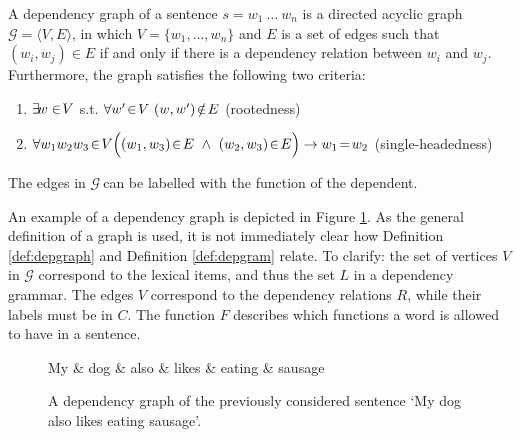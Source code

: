 \begin{definition}\label{def:depgraph}
A dependency graph of a sentence $s = w_1~\ldots~w_n$ is a directed acyclic graph $\mathcal{G} = \langle V, E\rangle$, in which $V = \{w_1, \ldots,w_n\}$ and $E$ is a set of edges such that $(w_i,w_j)\in E$ if and only if there is a dependency relation between $w_i$ and $w_j$. Furthermore, the graph satisfies the following two criteria:
\begin{enumerate}
\item $\exists\negthinspace w\in\negthinspace V$ s.t. $\forall w'\negthinspace\in\negthinspace V~(w,w')\negthinspace\notin\negthinspace E$ \hfill (rootedness)
\item $\forall w_1 w_2 w_3\negthinspace \in\negthinspace V\Big( (w_1,w_3)\negthinspace\in\negthinspace E~\land~(w_2,w_3)\negthinspace \in\negthinspace E\Big) \rightarrow w_1\negthinspace=\negthinspace w_2$ \hfill (single-headedness)
\end{enumerate}
The edges in $\mathcal{G}~$can be labelled with the function of the dependent.
\end{definition}

\noindent An example of a dependency graph is depicted in Figure \ref{fig:depgraph}. As the general definition of a graph is used, it is not immediately clear how  Definition \ref{def:depgraph} and Definition \ref{def:depgram} relate. To clarify: the set of vertices $V$ in $\mathcal{G}$ correspond to the lexical items, and thus the set $L$ in a dependency grammar. The edges $V$ correspond to the dependency relations $R$, while their labels must be in $C$. The function $F$ describes which functions a word is allowed to have in a sentence. 

\begin{figure}[!ht]
\centering
\begin{dependency}[theme=simple]%
\begin{deptext}[column sep=.5cm, row sep=.1ex]
My \& dog \& also \& likes \& eating \& sausage \\
\end{deptext}
\end{dependency}
\caption{A dependency graph of the previously considered sentence `My dog also likes eating sausage'.}\label{fig:depgraph}
\end{figure}

